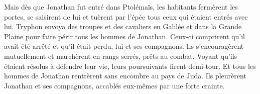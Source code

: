 Mais dès que Jonathan fut entré dans Ptolémaïs,
	les habitants fermèrent les portes,
	se saisirent de lui et tuèrent par l’épée tous ceux qui étaient entrés avec lui.
Tryphon envoya des troupes et des cavaliers en Galilée et dans la Grande Plaine
	pour faire périr tous les hommes de Jonathan.
Ceux-ci comprirent qu’il avait été arrêté et qu’il était perdu, lui et ses compagnons.
Ils s’encouragèrent mutuellement et marchèrent en rangs serrés, prêts au combat.
Voyant qu’ils étaient résolus à défendre leur vie, leurs poursuivants firent demi-tour.
	Et tous les hommes de Jonathan rentrèrent sans encombre au pays de Juda.
Ils pleurèrent Jonathan et ses compagnons, accablés eux-mêmes par une forte crainte.
